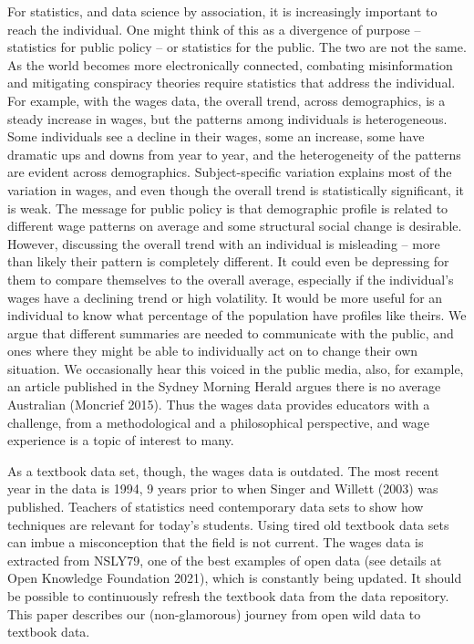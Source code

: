 \documentclass{article}
\begin{document}
For statistics, and data science by association, it is increasingly important to reach the individual. One might think of this as a divergence of purpose -- statistics for public policy -- or statistics for the public. The two are not the same. As the world becomes more electronically connected, combating misinformation and mitigating conspiracy theories require statistics that address the individual. For example, with the wages data, the overall trend, across demographics, is a steady increase in wages, but the patterns among individuals is heterogeneous. Some individuals see a decline in their wages, some an increase, some have dramatic ups and downs from year to year, and the heterogeneity of the patterns are evident across demographics. Subject-specific variation explains most of the variation in wages, and even though the overall trend is statistically significant, it is weak. The message for public policy is that demographic profile is related to different wage patterns on average and some structural social change is desirable. However, discussing the overall trend with an individual is misleading -- more than likely their pattern is completely different. It could even be depressing for them to compare themselves to the overall average, especially if the individual's wages have a declining trend or high volatility. It would be more useful for an individual to know what percentage of the population have profiles like theirs. We argue that different summaries are needed to communicate with the public, and ones where they might be able to individually act on to change their own situation. We occasionally hear this voiced in the public media, also, for example, an article published in the Sydney Morning Herald argues there is no average Australian (Moncrief 2015). Thus the wages data provides educators with a challenge, from a methodological and a philosophical perspective, and wage experience is a topic of interest to many.

As a textbook data set, though, the wages data is outdated. The most recent year in the data is 1994, 9 years prior to when Singer and Willett (2003) was published. Teachers of statistics need contemporary data sets to show how techniques are relevant for today's students. Using tired old textbook data sets can imbue a misconception that the field is not current. The wages data is extracted from NSLY79, one of the best examples of open data (see details at Open Knowledge Foundation 2021), which is constantly being updated. It should be possible to continuously refresh the textbook data from the data repository. This paper describes our (non-glamorous) journey from open wild data to textbook data.
\end{document}
